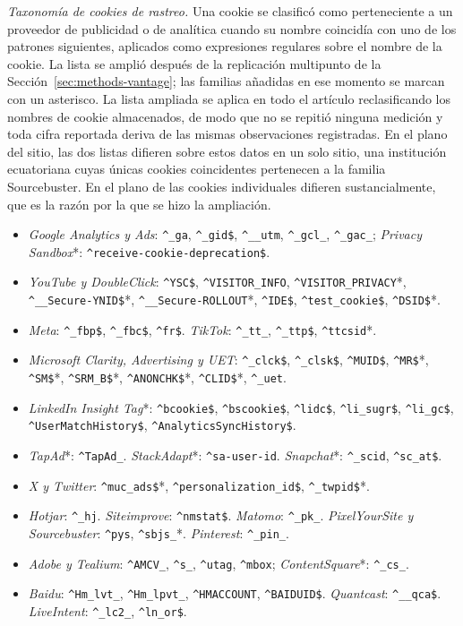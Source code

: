 \documentclass[pdflatex,sn-basic,Numbered,iicol]{sn-jnl}
\theoremstyle{thmstyleone}
\theoremstyle{thmstyletwo}
\theoremstyle{thmstylethree}
\begin{document}
\begin{appendices}
\emph{Taxonom\'ia de cookies de rastreo.} Una cookie se clasific\'o como perteneciente a un proveedor de publicidad o de anal\'itica cuando su nombre coincid\'ia con uno de los patrones siguientes, aplicados como expresiones regulares sobre el nombre de la cookie. La lista se ampli\'o despu\'es de la replicaci\'on multipunto de la Secci\'on~\ref{sec:methods-vantage}; las familias a\~nadidas en ese momento se marcan con un asterisco. La lista ampliada se aplica en todo el art\'iculo reclasificando los nombres de cookie almacenados, de modo que no se repiti\'o ninguna medici\'on y toda cifra reportada deriva de las mismas observaciones registradas. En el plano del sitio, las dos listas difieren sobre estos datos en un solo sitio, una instituci\'on ecuatoriana cuyas \'unicas cookies coincidentes pertenecen a la familia Sourcebuster. En el plano de las cookies individuales difieren sustancialmente, que es la raz\'on por la que se hizo la ampliaci\'on.

\begin{itemize}
	\item \emph{Google Analytics y Ads}: \verb|^_ga|, \verb|^_gid$|, \verb|^__utm|, \verb|^_gcl_|, \verb|^_gac_|; \emph{Privacy Sandbox}*: \verb|^receive-cookie-deprecation$|.
	\item \emph{YouTube y DoubleClick}: \verb|^YSC$|, \verb|^VISITOR_INFO|, \verb|^VISITOR_PRIVACY|*, \verb|^__Secure-YNID$|*, \verb|^__Secure-ROLLOUT|*, \verb|^IDE$|, \verb|^test_cookie$|, \verb|^DSID$|*.
	\item \emph{Meta}: \verb|^_fbp$|, \verb|^_fbc$|, \verb|^fr$|. \emph{TikTok}: \verb|^_tt_|, \verb|^_ttp$|, \verb|^ttcsid|*.
	\item \emph{Microsoft Clarity, Advertising y UET}: \verb|^_clck$|, \verb|^_clsk$|, \verb|^MUID$|, \verb|^MR$|*, \verb|^SM$|*, \verb|^SRM_B$|*, \verb|^ANONCHK$|*, \verb|^CLID$|*, \verb|^_uet|.
	\item \emph{LinkedIn Insight Tag}*: \verb|^bcookie$|, \verb|^bscookie$|, \verb|^lidc$|, \verb|^li_sugr$|, \verb|^li_gc$|, \verb|^UserMatchHistory$|, \verb|^AnalyticsSyncHistory$|.
	\item \emph{TapAd}*: \verb|^TapAd_|. \emph{StackAdapt}*: \verb|^sa-user-id|. \emph{Snapchat}*: \verb|^_scid|, \verb|^sc_at$|.
	\item \emph{X y Twitter}: \verb|^muc_ads$|*, \verb|^personalization_id$|, \verb|^_twpid$|*.
	\item \emph{Hotjar}: \verb|^_hj|. \emph{Siteimprove}: \verb|^nmstat$|. \emph{Matomo}: \verb|^_pk_|. \emph{PixelYourSite y Sourcebuster}: \verb|^pys|, \verb|^sbjs_|*. \emph{Pinterest}: \verb|^_pin_|.
	\item \emph{Adobe y Tealium}: \verb|^AMCV_|, \verb|^s_|, \verb|^utag|, \verb|^mbox|; \emph{ContentSquare}*: \verb|^_cs_|.
	\item \emph{Baidu}: \verb|^Hm_lvt_|, \verb|^Hm_lpvt_|, \verb|^HMACCOUNT|, \verb|^BAIDUID$|. \emph{Quantcast}: \verb|^__qca$|. \emph{LiveIntent}: \verb|^_lc2_|, \verb|^ln_or$|.
\end{itemize}


\end{appendices}
\end{document}
